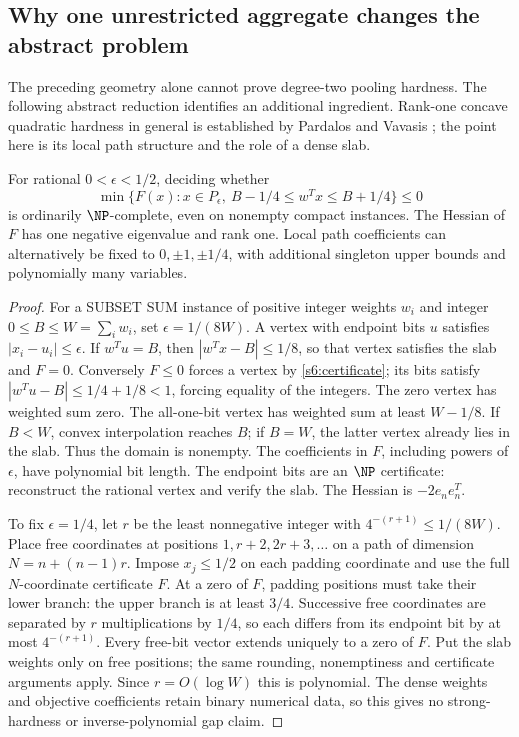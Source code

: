 \subsection{Why one unrestricted aggregate changes the abstract problem}
\label{s6:slab}
The preceding geometry alone cannot prove degree-two pooling hardness.
The following abstract reduction identifies an additional ingredient.
Rank-one concave quadratic hardness in general is established by
Pardalos and Vavasis \cite{s6:pardalos1991}; the point here is its local
path structure and the role of a dense slab.

\begin{proposition}\label{s6:slab-hardness}
For rational $0<\epsilon<1/2$, deciding whether
\[
 \min\{F(x):x\in P_\epsilon,\ B-1/4\le w^Tx\le B+1/4\}\le0
\]
is ordinarily $\NP$-complete, even on nonempty compact instances.
The Hessian of $F$ has one negative eigenvalue and rank one. Local
path coefficients can alternatively be fixed to $0,\pm1,\pm1/4$,
with additional singleton upper bounds and polynomially many variables.
\end{proposition}
\begin{proof}
For a SUBSET SUM instance of positive integer weights $w_i$ and integer
$0\le B\le W=\sum_iw_i$, set $\epsilon=1/(8W)$. A vertex with
endpoint bits $u$ satisfies $|x_i-u_i|\le\epsilon$.
If $w^Tu=B$, then $|w^Tx-B|\le1/8$, so that vertex satisfies the
slab and $F=0$. Conversely $F\le0$ forces a vertex by
\cref{s6:certificate}; its bits satisfy
$|w^Tu-B|\le1/4+1/8<1$, forcing equality of the integers.
The zero vertex has weighted sum zero. The all-one-bit vertex has
weighted sum at least $W-1/8$. If $B<W$, convex interpolation reaches
$B$; if $B=W$, the latter vertex already lies in the slab.
Thus the domain is nonempty. The coefficients in $F$, including powers
of $\epsilon$, have polynomial bit length. The endpoint bits are an
$\NP$ certificate: reconstruct the rational vertex and verify the slab.
The Hessian is $-2e_ne_n^T$.

To fix $\epsilon=1/4$, let $r$ be the least nonnegative integer with
$4^{-(r+1)}\le1/(8W)$. Place free coordinates at positions
$1,r+2,2r+3,\ldots$ on a path of dimension $N=n+(n-1)r$.
Impose $x_j\le1/2$ on each padding coordinate and use the full
$N$-coordinate certificate $F$. At a zero of $F$, padding positions
must take their lower branch: the upper branch is at least $3/4$.
Successive free coordinates are separated by $r$ multiplications by
$1/4$, so each differs from its endpoint bit by at most $4^{-(r+1)}$.
Every free-bit vector extends uniquely to a zero of $F$. Put the slab
weights only on free positions; the same rounding, nonemptiness and
certificate arguments apply. Since $r=O(\log W)$ this is polynomial.
The dense weights and objective coefficients retain binary numerical
data, so this gives no strong-hardness or inverse-polynomial gap claim.
\end{proof}

